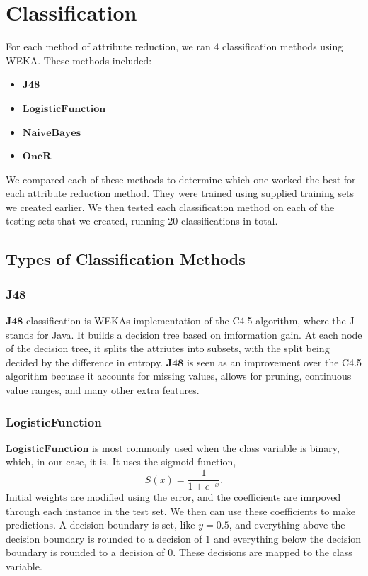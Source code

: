 \documentclass[12pt]{article}
\begin{document}
\newpage
\section{Classification}
For each method of attribute reduction, we ran $4$ classification methods using WEKA. These methods included: 
\begin{itemize}
    \item $\textbf{J48}$
    \item $\textbf{LogisticFunction}$
    \item $\textbf{NaiveBayes}$
    \item $\textbf{OneR}$
\end{itemize}
We compared each of these methods to determine which one worked the best for each attribute reduction method. They were trained using supplied training sets we created earlier. We then tested each classification method on each of the testing sets that we created, running $20$ classifications in total.

\subsection{Types of Classification Methods}
\subsubsection{J48}
$\textbf{J48}$ classification is WEKA\textquotesingle s implementation of the C4.5 algorithm, where the J stands for Java. It builds a decision tree based on imformation gain. At each node of the decision tree, it splits the attriutes into subsets, with the split being decided by the difference in entropy. $\textbf{J48}$ is seen as an improvement over the C4.5 algorithm becuase it accounts for missing values, allows for pruning, continuous value ranges, and many other extra features. 

\subsubsection{LogisticFunction}
$\textbf{LogisticFunction}$ is most commonly used when the class variable is binary, which, in our case, it is. It uses the sigmoid function, $$S(x) = \frac{1}{1 + e^{-x}}.$$ Initial weights are modified using the error, and the coefficients are imrpoved through each instance in the test set. We then can use these coefficients to make predictions. A decision boundary is set, like $ y = 0.5$, and everything above the decision boundary is rounded to a decision of $1$ and everything below the decision boundary is rounded to a decision of $0$. These decisions are mapped to the class variable. 
\end{document}
